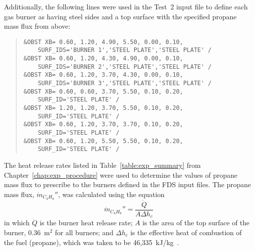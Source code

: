 Additionally, the following lines were used in the Test~2 input file to define each gas burner as having steel sides and a top surface with the specified propane mass flux from above:
\begin{quote}
\begin{verbatim}
&OBST XB= 0.60, 1.20, 4.90, 5.50, 0.00, 0.10, 
    SURF_IDS='BURNER 1','STEEL PLATE','STEEL PLATE' /
&OBST XB= 0.60, 1.20, 4.30, 4.90, 0.00, 0.10, 
    SURF_IDS='BURNER 2','STEEL PLATE','STEEL PLATE' /
&OBST XB= 0.60, 1.20, 3.70, 4.30, 0.00, 0.10, 
    SURF_IDS='BURNER 3','STEEL PLATE','STEEL PLATE' /
&OBST XB= 0.60, 0.60, 3.70, 5.50, 0.10, 0.20, 
    SURF_ID='STEEL PLATE' /
&OBST XB= 1.20, 1.20, 3.70, 5.50, 0.10, 0.20, 
    SURF_ID='STEEL PLATE' /
&OBST XB= 0.60, 1.20, 3.70, 3.70, 0.10, 0.20, 
    SURF_ID='STEEL PLATE' /
&OBST XB= 0.60, 1.20, 5.50, 5.50, 0.10, 0.20, 
    SURF_ID='STEEL PLATE' /
\end{verbatim}
\end{quote}

The heat release rates listed in Table~\ref{table:exp_summary} from Chapter~\ref{chap:exp_procedure} were used to determine the values of propane mass flux to prescribe to the burners defined in the FDS input files. The propane mass flux, $\dot{m}_{C_3H_8}''$, was calculated using the equation
\begin{equation}
  \dot{m}_{C_3H_8}''=\frac{\dot{Q}}{A\Delta h_c}
\end{equation}
in which $\dot{Q}$ is the burner heat release rate; $A$ is the area of the top surface of the burner, 0.36~m$^2$ for all burners; and $\Delta h_c$ is the effective heat of combustion of the fuel (propane), which was taken to be 46,335~kJ/kg~\cite{Poling:1}.


